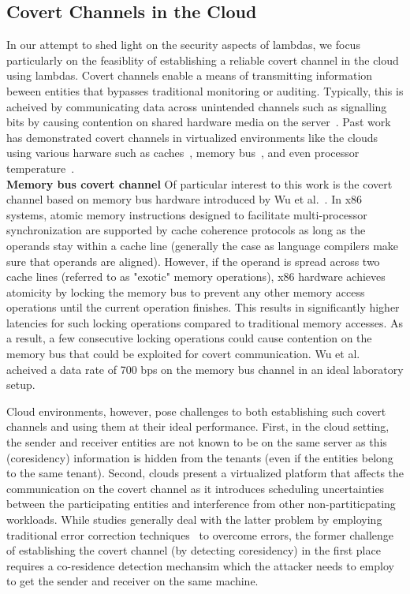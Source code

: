 \subsection{Covert Channels in the Cloud}
\label{sec:background:covertchannels}
In our attempt to shed light on the security aspects of lambdas, we focus 
particularly on the feasiblity of establishing a reliable covert channel 
in the cloud using lambdas. 
Covert channels enable a means of transmitting information beween entities 
that bypasses traditional monitoring or auditing. Typically, this is acheived 
by communicating data across unintended channels such as signalling bits by 
causing contention on shared hardware media on the server~\cite{L2cacheCovertChannels,
ProcessorCovertChannels,ThermalCovertChannel,SshOverCovertChannel,wuusenix2012}. 
Past work has demonstrated covert channels in virtualized environments like 
the clouds using various harware such as caches~\cite{ristenpartccs2009,L2cacheCovertChannels},
memory bus~\cite{wuusenix2012}, and even processor temperature~\cite{ThermalCovertChannel}. \\

\noindent \textbf{Memory bus covert channel} 
Of particular interest to this work is the covert channel based on memory bus 
hardware introduced by Wu et al.~\cite{wuusenix2012}. 
In x86 systems, atomic memory instructions designed to facilitate 
multi-processor synchronization are supported by cache coherence protocols as
long as the operands stay within a cache line (generally the case as language
compilers make sure that operands are aligned). However, if the operand is
spread across two cache lines (referred to as "exotic" memory operations), x86
hardware achieves atomicity by locking the memory bus to prevent any other
memory access operations until the current operation finishes. This results in
significantly higher latencies for such locking operations compared to traditional 
memory accesses. As a result, a few consecutive locking operations could cause 
contention on the memory bus that could be exploited for covert communication.
Wu et al. acheived a data rate of 700 bps on the memory bus channel in an 
ideal laboratory setup.

Cloud environments, however, pose challenges to both establishing  
such covert channels and using them at their ideal performance. First, in the 
cloud setting, the sender and receiver entities are not known to be on the same server 
as this (coresidency) information is hidden from the tenants (even if the entities belong to 
the same tenant). Second, clouds present a virtualized platform that affects 
the communication on the covert channel as it introduces scheduling uncertainties
between the participating entities and interference from other non-partiticpating 
workloads. While studies generally deal with the latter problem by employing 
traditional error correction techniques~\cite{wuusenix2012} to overcome errors, 
the former challenge of establishing the covert channel (by detecting coresidency) 
in the first place requires a co-residence detection mechansim which the 
attacker needs to employ to get the sender and receiver on the same machine. 


